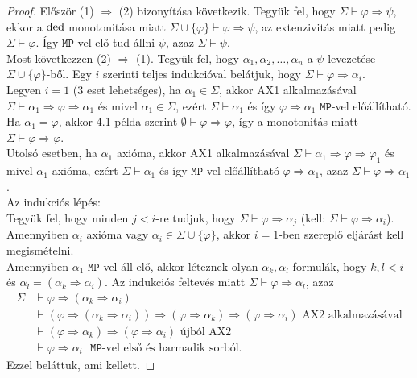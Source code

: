 \begin{proof}
Először (1) $\Rightarrow$ (2) bizonyítása következik. Tegyük fel, hogy $\Sigma \vdash \varphi \Rightarrow \psi$, ekkor a $\mathop{\mathrm{ded}}$ monotonitása miatt $\Sigma \cup \lbrace \varphi \rbrace \vdash \varphi \Rightarrow \psi$, az extenzivitás miatt pedig $\Sigma \vdash \varphi$. Így $\texttt{MP}$-vel elő tud állni $\psi$, azaz $\Sigma \vdash \psi$. \\
\indent Most következzen (2) $\Rightarrow$ (1). Tegyük fel, hogy $\alpha_1, \alpha_2, \ldots, \alpha_n$ a $\psi$ levezetése $\Sigma \cup \lbrace \varphi \rbrace$-ből. Egy $i$ szerinti teljes indukcióval belátjuk, hogy $\Sigma \vdash \varphi \Rightarrow \alpha_i$. \\
\indent Legyen $i=1$ (3 eset lehetséges), ha $\alpha_1 \in \Sigma$, akkor AX1 alkalmazásával $\Sigma \vdash \alpha_1 \Rightarrow \varphi \Rightarrow \alpha_1$ és mivel $\alpha_1 \in \Sigma$, ezért $\Sigma \vdash \alpha_1$ és így $\varphi \Rightarrow \alpha_1$ $\texttt{MP}$-vel előállítható. \\
\indent Ha $\alpha_1 = \varphi$, akkor 4.1 példa szerint $\emptyset \vdash \varphi \Rightarrow \varphi$, így a monotonitás miatt $\Sigma \vdash \varphi \Rightarrow \varphi$. \\
\indent Utolsó esetben, ha $\alpha_1$ axióma, akkor AX1 alkalmazásával $\Sigma \vdash \alpha_1 \Rightarrow \varphi \Rightarrow \varphi_1$ és mivel $\alpha_1$ axióma, ezért $\Sigma \vdash \alpha_1$ és így $\texttt{MP}$-vel előállítható $\varphi \Rightarrow \alpha_1$, azaz $\Sigma \vdash \varphi \Rightarrow \alpha_1$.\\
\indent Az indukciós lépés: \\
Tegyük fel, hogy minden $j < i$-re tudjuk, hogy $\Sigma \vdash \varphi \Rightarrow \alpha_j$ (kell: $\Sigma \vdash \varphi \Rightarrow \alpha_i$). Amennyiben $\alpha_i$ axióma vagy $\alpha_i \in \Sigma \cup \lbrace \varphi \rbrace$, akkor $i=1$-ben szereplő eljárást kell megismételni. \\
\indent Amennyiben $\alpha_1$ $\texttt{MP}$-vel áll elő, akkor léteznek olyan $\alpha_k, \alpha_l$ formulák, hogy $k,l < i$ és $\alpha_l = (\alpha_k \Rightarrow \alpha_i)$. Az indukciós feltevés miatt $\Sigma \vdash \varphi \Rightarrow \alpha_l$, azaz 
\begin{equation*}
\begin{split}
\Sigma &\vdash \varphi \Rightarrow (\alpha_k \Rightarrow \alpha_i) \\
& \vdash (\varphi \Rightarrow (\alpha_k \Rightarrow \alpha_i)) \Rightarrow (\varphi \Rightarrow \alpha_k) \Rightarrow (\varphi \Rightarrow \alpha_i) \text{ AX2 alkalmazásával} \\
& \vdash (\varphi \Rightarrow \alpha_k) \Rightarrow (\varphi \Rightarrow \alpha_i) \text{ újból AX2} \\
& \vdash \varphi \Rightarrow \alpha_i \text{ $\texttt{MP}$-vel első és harmadik sorból.}
\end{split}
\end{equation*}
Ezzel beláttuk, ami kellett.
\end{proof}
